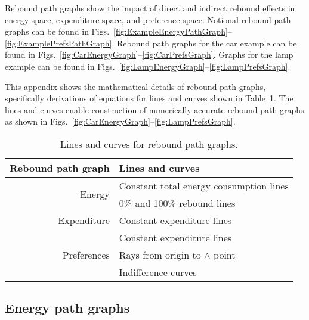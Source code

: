 
Rebound path graphs show the impact of direct and indirect rebound effects
in energy space, expenditure space, and preference space.
Notional rebound path graphs can be found in 
Figs.~\ref{fig:ExampleEnergyPathGraph}--\ref{fig:ExamplePrefsPathGraph}.
Rebound path graphs for the car example can be found in 
Figs.~\ref{fig:CarEnergyGraph}--\ref{fig:CarPrefsGraph}.
Graphs for the lamp example can be found in
Figs.~\ref{fig:LampEnergyGraph}--\ref{fig:LampPrefsGraph}.

This appendix shows the mathematical details of rebound path graphs,
specifically derivations of equations for lines and curves 
shown in Table~\ref{tab:lines_and_curves}.
The lines and curves enable construction of numerically accurate
rebound path graphs 
as shown in Figs.~\ref{fig:CarEnergyGraph}--\ref{fig:LampPrefsGraph}.

\begin{table}
\centering
\caption{Lines and curves for rebound path graphs.}
\label{tab:lines_and_curves}
\begin{tabular}{rl}
\toprule
Rebound path graph           & Lines and curves                        \\ 
\midrule
\multirow{2}{*}{Energy}      & Constant total energy consumption lines \\
                             & 0\% and 100\% rebound lines             \\
\midrule
Expenditure                  & Constant expenditure lines              \\
\midrule
\multirow{3}{*}{Preferences} & Constant expenditure lines              \\
                             & Rays from origin to $\wedge$ point      \\
                             & Indifference curves                     \\
\bottomrule
\end{tabular}
\end{table}


\subsection{Energy path graphs}
\label{sec:energy_path_graph_details}

